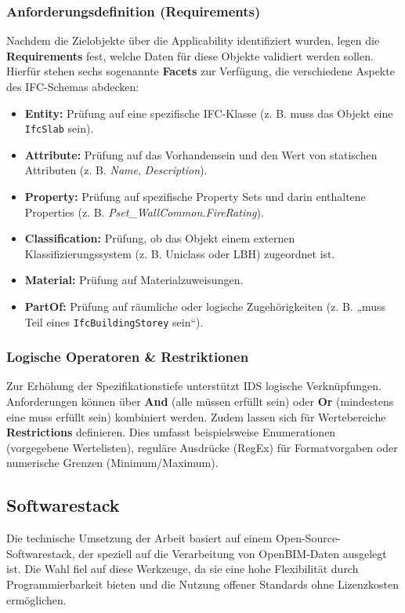 \subsubsection{Anforderungsdefinition (Requirements)}
Nachdem die Zielobjekte über die Applicability identifiziert wurden, legen die \textbf{Requirements} fest, welche Daten für diese Objekte validiert werden sollen. Hierfür stehen sechs sogenannte \textbf{Facets} zur Verfügung, die verschiedene Aspekte des IFC-Schemas abdecken:
\begin{itemize}
    \item \textbf{Entity:} Prüfung auf eine spezifische IFC-Klasse (z. B. muss das Objekt eine \texttt{IfcSlab} sein).
    \item \textbf{Attribute:} Prüfung auf das Vorhandensein und den Wert von statischen Attributen (z. B. \textit{Name}, \textit{Description}).
    \item \textbf{Property:} Prüfung auf spezifische Property Sets und darin enthaltene Properties (z. B. \textit{Pset\_WallCommon.FireRating}).
    \item \textbf{Classification:} Prüfung, ob das Objekt einem externen Klassifizierungssystem (z. B. Uniclass oder LBH) zugeordnet ist.
    \item \textbf{Material:} Prüfung auf Materialzuweisungen.
    \item \textbf{PartOf:} Prüfung auf räumliche oder logische Zugehörigkeiten (z. B. „muss Teil eines \texttt{IfcBuildingStorey} sein“).
\end{itemize}

\subsubsection{Logische Operatoren \& Restriktionen}
Zur Erhöhung der Spezifikationstiefe unterstützt IDS logische Verknüpfungen. Anforderungen können über \textbf{And} (alle müssen erfüllt sein) oder \textbf{Or} (mindestens eine muss erfüllt sein) kombiniert werden. Zudem lassen sich für Wertebereiche \textbf{Restrictions} definieren. Dies umfasst beispielsweise Enumerationen (vorgegebene Wertelisten), reguläre Ausdrücke (RegEx) für Formatvorgaben oder numerische Grenzen (Minimum/Maximum).


\subsection{Softwarestack}
\label{subsec:softwarestack}
Die technische Umsetzung der Arbeit basiert auf einem Open-Source-Softwarestack, der speziell auf die Verarbeitung von OpenBIM-Daten ausgelegt ist. Die Wahl fiel auf diese Werkzeuge, da sie eine hohe Flexibilität durch Programmierbarkeit bieten und die Nutzung offener Standards ohne Lizenzkosten ermöglichen.


